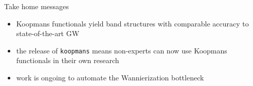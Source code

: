 \documentclass[xcolor=table,aspectratio=169]{beamer}
\numberwithin{equation}{section}
\begin{document}
\begin{frame}{Take home messages}
   \hfill

   \begin{itemize}
      \item Koopmans functionals yield band structures with comparable accuracy to state-of-the-art GW
      \item the release of \texttt{koopmans} means non-experts can now use Koopmans functionals in their own research
      \item work is ongoing to automate the Wannierization bottleneck
   \end{itemize}

\end{frame}

\begingroup
{}
\end{document}
